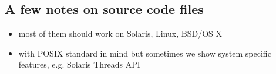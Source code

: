 \subsection{A few notes on source code files}

\begin{itemize}
\item most of them should work on Solaris, Linux, BSD/OS X
\item with POSIX standard in mind but sometimes we show system specific
features, e.g. Solaris Threads API
\end{itemize}
